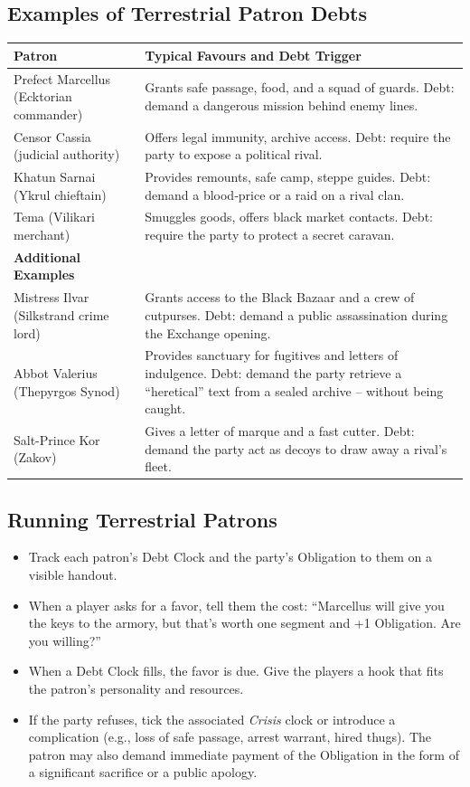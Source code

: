 \subsection{Examples of Terrestrial Patron Debts}
\begin{tcolorbox}[title=Sample Terrestrial Patrons, colback=white!97!gray, colframe=black!80!gray]
\begin{tabularx}{\textwidth}{lX}
\toprule
\textbf{Patron} & \textbf{Typical Favours and Debt Trigger} \\
\midrule
Prefect Marcellus (Ecktorian commander) & Grants safe passage, food, and a squad of guards. Debt: demand a dangerous mission behind enemy lines. \\
Censor Cassia (judicial authority) & Offers legal immunity, archive access. Debt: require the party to expose a political rival. \\
Khatun Sarnai (Ykrul chieftain) & Provides remounts, safe camp, steppe guides. Debt: demand a blood‑price or a raid on a rival clan. \\
Tema (Vilikari merchant) & Smuggles goods, offers black market contacts. Debt: require the party to protect a secret caravan. \\
\addlinespace
\textbf{Additional Examples} & \\
Mistress Ilvar (Silkstrand crime lord) & Grants access to the Black Bazaar and a crew of cutpurses. Debt: demand a public assassination during the Exchange opening. \\
Abbot Valerius (Thepyrgos Synod) & Provides sanctuary for fugitives and letters of indulgence. Debt: demand the party retrieve a “heretical” text from a sealed archive – without being caught. \\
Salt-Prince Kor (Zakov) & Gives a letter of marque and a fast cutter. Debt: demand the party act as decoys to draw away a rival’s fleet. \\
\bottomrule
\end{tabularx}
\end{tcolorbox}

\subsection{Running Terrestrial Patrons}
\begin{itemize}
  \item Track each patron’s Debt Clock and the party’s Obligation to them on a visible handout.
  \item When a player asks for a favor, tell them the cost: “Marcellus will give you the keys to the armory, but that’s worth one segment and +1 Obligation. Are you willing?”
  \item When a Debt Clock fills, the favor is due. Give the players a hook that fits the patron’s personality and resources.
  \item If the party refuses, tick the associated \textit{Crisis} clock or introduce a complication (e.g., loss of safe passage, arrest warrant, hired thugs). The patron may also demand immediate payment of the Obligation in the form of a significant sacrifice or a public apology.
\end{itemize}

